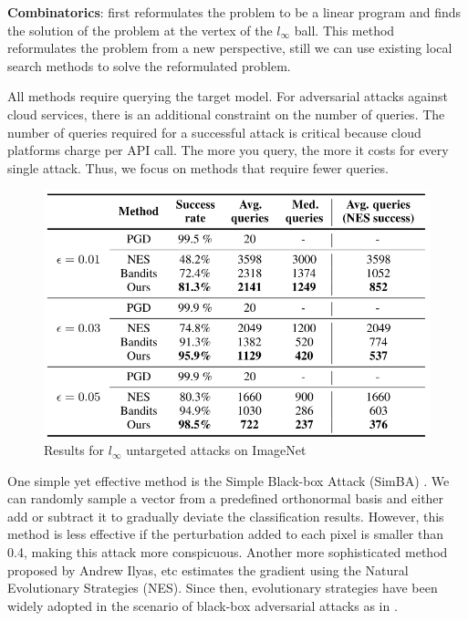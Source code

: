 \textbf{Combinatorics}: \citep{moon2019parsimonious} first reformulates the problem to be a linear program and finds the solution of the problem at the vertex of the $l_\infty$ ball. This method reformulates the problem from a new perspective, still we can  use existing local search methods to solve the reformulated problem.

All methods require querying the target model. For adversarial attacks against cloud services, there is an additional constraint on the number of queries. The number of queries required for a successful attack is critical because cloud platforms charge per API call. The more you query, the more it costs for every single attack. Thus, we focus on methods that require fewer queries.

\begin{figure}[H]
\centering
\includegraphics[scale=0.65]{figures/chapter_classification/parsimounious.png}
\caption{Results for $l_{\infty}$ untargeted attacks on ImageNet \citep{moon2019parsimonious}}
\label{fig.parsi}
\end{figure}

One simple yet effective method is the Simple Black-box Attack (SimBA) \citep{guo2019simple}. We can randomly sample a vector from a predefined orthonormal basis and either add or subtract it to gradually deviate the classification results. However, this method is less effective if the perturbation added to each pixel is smaller than 0.4, making this attack more conspicuous. Another more sophisticated method proposed by Andrew Ilyas, etc \citep{ilyas2018black} estimates the gradient using the Natural Evolutionary Strategies (NES). Since then, evolutionary strategies have been widely adopted in the scenario of black-box adversarial attacks as in \citep{meunier2019yet} \citep{Ilie2021}.

